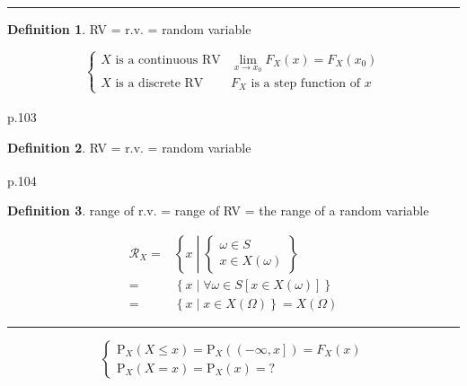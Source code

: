 \documentclass[
]{book}
\theoremstyle{definition}
\newtheorem{definition}{Definition}[chapter]
\theoremstyle{definition}
\theoremstyle{definition}
\theoremstyle{definition}
\theoremstyle{remark}
\begin{document}
\begin{center}\rule{0.5\linewidth}{0.5pt}\end{center}

\begin{definition}
\protect\hypertarget{def:unnamed-chunk-7}{}\label{def:unnamed-chunk-7}RV = r.v. = random variable
\end{definition}

\[
\begin{cases}
X\text{ is a continuous RV} & \lim\limits _{x\rightarrow x_{{\scriptscriptstyle 0}}}F_{{\scriptscriptstyle X}}\left(x\right)=F_{{\scriptscriptstyle X}}\left(x_{{\scriptscriptstyle 0}}\right)\\
X\text{ is a discrete RV} & F_{{\scriptscriptstyle X}}\text{ is a step function of }x
\end{cases}
\]

\textsuperscript{} p.103

\begin{definition}
\protect\hypertarget{def:unnamed-chunk-8}{}\label{def:unnamed-chunk-8}RV = r.v. = random variable
\end{definition}

\textsuperscript{} p.104

\begin{definition}
\protect\hypertarget{def:unnamed-chunk-9}{}\label{def:unnamed-chunk-9}range of r.v. = range of RV = the range of a random variable
\end{definition}

\[
\begin{aligned}
\mathcal{R}_{{\scriptscriptstyle X}}=&\left\{ x\middle|\begin{cases}
\omega\in S\\
x\in X\left(\omega\right)
\end{cases}\right\} \\=&\left\{ x\middle|\forall\omega\in S\left[x\in X\left(\omega\right)\right]\right\} \\=&\left\{ x\middle|x\in X\left(\Omega\right)\right\} =X\left(\Omega\right)
\end{aligned}
\]

\begin{center}\rule{0.5\linewidth}{0.5pt}\end{center}

\[
\begin{cases}
\mathrm{P}_{{\scriptscriptstyle X}}\left(X\le x\right)=\mathrm{P}_{{\scriptscriptstyle X}}\left(\left(-\infty,x\right]\right)=F_{{\scriptscriptstyle X}}\left(x\right)\\
\mathrm{P}_{{\scriptscriptstyle X}}\left(X=x\right)=\mathrm{P}_{{\scriptscriptstyle X}}\left(x\right)=?
\end{cases}
\]
\end{document}
